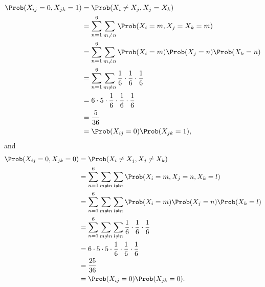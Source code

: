 \begin{enumerate}
          \begin{align*}
              \Prob(X_{ij} = 0, X_{jk} = 1) & = \Prob(X_i \neq X_j, X_j = X_k)                                                   \\
                                            & = \sum_{n = 1}^{6} \sum_{m \neq n} \Prob(X_i = m, X_j = X_k = m)                   \\
                                            & = \sum_{n = 1}^{6} \sum_{m \neq n} \Prob(X_i = m) \Prob(X_j = n) \Prob(X_k = n)    \\
                                            & = \sum_{n = 1}^{6} \sum_{m \neq n} \frac{1}{6} \cdot \frac{1}{6} \cdot \frac{1}{6} \\
                                            & = 6 \cdot 5 \cdot \frac{1}{6} \cdot \frac{1}{6} \cdot \frac{1}{6}                  \\
                                            & = \frac{5}{36}                                                                     \\
                                            & = \Prob(X_{ij} = 0) \Prob(X_{jk} = 1),
          \end{align*}
          and
          \begin{align*}
              \Prob(X_{ij} = 0, X_{jk} = 0) & = \Prob(X_i \neq X_j, X_j \neq X_k)                                                                \\
                                            & = \sum_{n = 1}^{6} \sum_{m \neq n} \sum_{l \neq n} \Prob(X_i = m, X_j = n, X_k = l)                \\
                                            & = \sum_{n = 1}^{6} \sum_{m \neq n} \sum_{l \neq n} \Prob(X_i = m) \Prob(X_j = n) \Prob(X_k = l)    \\
                                            & = \sum_{n = 1}^{6} \sum_{m \neq n} \sum_{l \neq n} \frac{1}{6} \cdot \frac{1}{6} \cdot \frac{1}{6} \\
                                            & = 6 \cdot 5 \cdot 5 \cdot \frac{1}{6} \cdot \frac{1}{6} \cdot \frac{1}{6}                          \\
                                            & = \frac{25}{36}                                                                                    \\
                                            & = \Prob(X_{ij} = 0) \Prob(X_{jk} = 0).
          \end{align*}


\end{enumerate}
